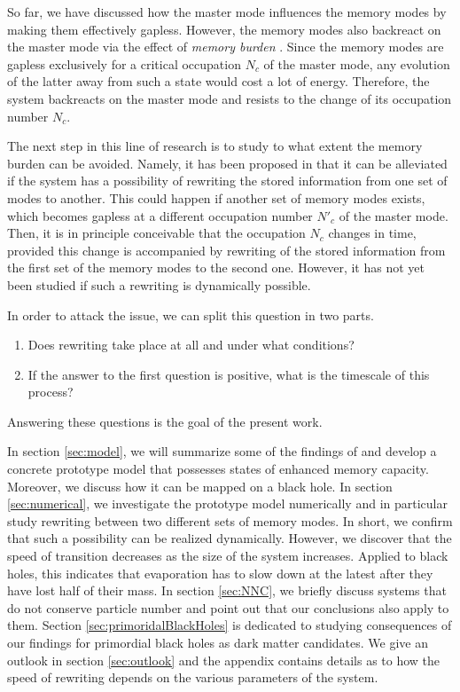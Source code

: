 \documentclass[aps,prd,reprint,superscriptaddress,nofootinbib]{revtex4-2}
\begin{document}
So far, we have discussed how the master mode influences the memory modes 
by making them effectively gapless. However, the memory modes also backreact on the master mode via the effect of \textit{memory burden} \cite{1810.02336, 1812.08749}. Since the memory modes are gapless exclusively for a critical occupation $N_c$ of the master mode, any evolution of the latter away from such a state would cost a lot of energy. Therefore, the system backreacts on the master mode and 
resists to the change of its occupation number $N_c$. 

The next step in this line of research is to study to what extent the memory burden can be avoided. Namely, it has been proposed in \cite{1810.02336} that it can be alleviated if the system has a possibility 
of rewriting the stored information from one set of modes to another.  
This could happen if another set of memory modes exists, which becomes gapless at a different occupation number $N'_c$ of the master mode. Then, it is in principle conceivable that the 
occupation $N_c$
changes in time, provided this change is accompanied by 
rewriting of  the stored information from the first set of the memory 
modes to the second one. However, it has not yet been studied if such a rewriting is dynamically possible. 

In order to attack the issue, we can split this question in two parts.
\begin{enumerate}
	\item Does rewriting take place at all and under what conditions?
	\item If the answer to the first question is positive, what is the timescale of this process?
\end{enumerate}
Answering these questions is the goal of the present work.

In section \ref{sec:model}, we will summarize some of the findings of \cite{1207.4059, 1507.02948,1507.08952, 1601.01329,1711.09079,1801.03918,1712.02233,1805.10292, 1810.02336, 1812.08749} and develop a concrete prototype model that possesses states of enhanced memory capacity. Moreover, we 
discuss how it can be mapped on a black hole. In section \ref{sec:numerical}, we investigate the prototype model numerically and in particular study rewriting between two different sets of memory modes.
In short, we confirm that such a possibility can be realized dynamically.
 However, we discover that the speed of transition decreases as the size of the system increases. 
Applied to black holes, this indicates
that evaporation has to slow down at the latest after they have lost half 
of their mass. In section \ref{sec:NNC}, we briefly discuss systems that do not conserve particle number and point out that our conclusions also apply to them.  Section \ref{sec:primoridalBlackHoles} is dedicated to studying consequences of our findings for primordial black holes as dark matter candidates.
We give an outlook in section \ref{sec:outlook} and the appendix contains 
details as to how the speed of rewriting depends on the various parameters of the system.
\end{document}
